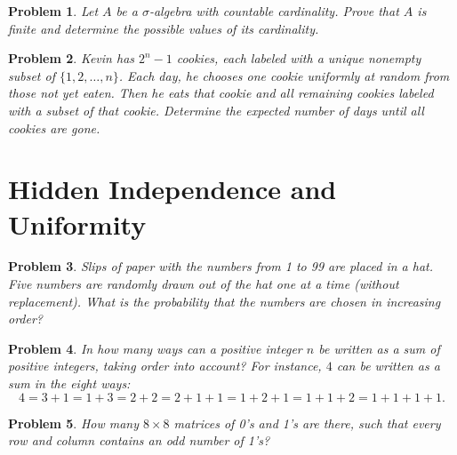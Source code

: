 \documentclass[12pt]{article}
\newtheorem{problem}{Problem}
\begin{document}
\begin{problem}
Let $A$ be a $\sigma$-algebra with countable cardinality. Prove that $A$ is finite and determine the
possible values of its cardinality.
\end{problem}

\begin{problem}
Kevin has $2^n-1$ cookies, each labeled with a unique nonempty subset of $\{1,2,\dots,n\}$. Each
day, he chooses one cookie uniformly at random from those not yet eaten. Then he eats that
cookie and all remaining cookies labeled with a subset of that cookie. Determine the expected
number of days until all cookies are gone.
\end{problem}

\section*{Hidden Independence and Uniformity}

\begin{problem}
Slips of paper with the numbers from 1 to 99 are placed in a hat. Five numbers are randomly drawn out of the hat one at a time (without replacement). What is the probability that the numbers are chosen in increasing order?
\end{problem}

\begin{problem}
In how many ways can a positive integer $n$ be written as a sum of positive integers, taking order into account? For instance, $4$ can be written as a sum in the eight ways: 
\[
4 = 3 + 1 = 1 + 3 = 2 + 2 = 2 + 1 + 1 = 1 + 2 + 1 = 1 + 1 + 2 = 1 + 1 + 1 + 1.
\]
\end{problem}

\begin{problem}
\textbf{\textcolor{red}{\heart}} How many $8 \times 8$ matrices of 0’s and 1’s are there, such that every row and column contains an odd number of 1’s?
\end{problem}
\end{document}
